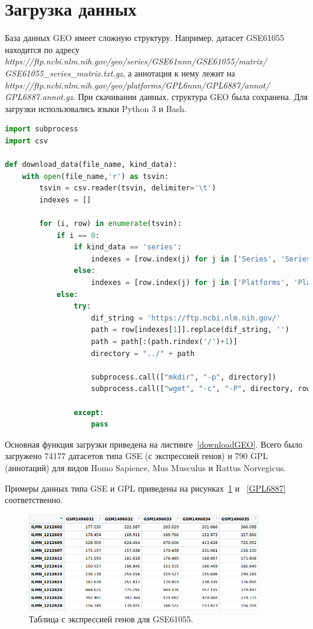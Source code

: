 \documentclass[times,specification,annotation]{itmo-student-thesis}
\begin{document}
\section{Загрузка данных}

База данных GEO имеет сложную структуру. Например, датасет GSE61055 находится по адресу \textit{https://ftp.ncbi.nlm.nih.gov/geo/series/GSE61nnn/GSE61055/matrix/} \textit{GSE61055\_series\_matrix.txt.gz}, а аннотация к нему лежит на \textit{https://ftp.ncbi.nlm.nih.gov/geo/platforms/GPL6nnn/GPL6887/annot/} \textit{GPL6887.annot.gz}. При скачивании данных, структура GEO была сохранена. Для загрузки использовались языки Python 3 и Bash. 

\begin{lstlisting}[float=!h, caption={Загрузка данных из GEO.}, captionpos=b, label={downloadGEO}, basicstyle=\footnotesize, language=Python]
import subprocess
import csv

def download_data(file_name, kind_data): 
    with open(file_name,'r') as tsvin:
        tsvin = csv.reader(tsvin, delimiter='\t')
        indexes = []
        
        for (i, row) in enumerate(tsvin):
            if i == 0:
                if kind_data == 'series':
                    indexes = [row.index(j) for j in ['Series', 'Series_url']]
                else:
                    indexes = [row.index(j) for j in ['Platforms', 'Platforms_url']]
            else:    
                try:
                    dif_string = 'https://ftp.ncbi.nlm.nih.gov/'
                    path = row[indexes[1]].replace(dif_string, '')
                    path = path[:(path.rindex('/')+1)]
                    directory = "../" + path

                    subprocess.call(["mkdir", "-p", directory])
                    subprocess.call(["wget", "-c", "-P", directory, row[indexes[1]]])

                except:
                    pass

\end{lstlisting}


Основная функция загрузки приведена на листинге~\ref{downloadGEO}. Всего было загружено 74177 датасетов типа GSE (с экспрессией генов) и 790 GPL (аннотаций) для видов Homo Sapience, Mus Musculus и Rattus Norvegicus. 

Примеры данных типа GSE и GPL приведены на рисунках~\ref{GSE61055} и ~\ref{GPL6887} соответственно. 

\begin{figure}[!h]
    \caption{Таблица с экспрессией генов для GSE61055.}\label{GSE61055}
    \centering
    \includegraphics[width=0.9\textwidth]{GSE61055.png}
\end{figure}  
\end{document}
